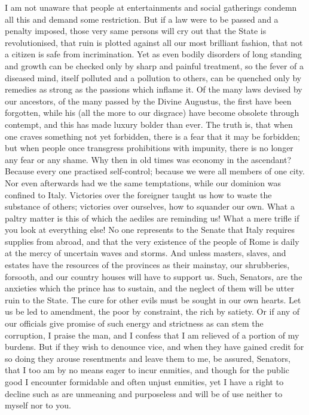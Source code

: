
I am not unaware that people at entertainments and social gatherings condemn all this and demand some restriction. But if a law were to be passed and a penalty imposed, those very same persons will cry out that the State is revolutionised, that ruin is plotted against all our most brilliant fashion, that not a citizen is safe from incrimination. Yet as even bodily disorders of long standing and growth can be checked only by sharp and painful treatment, so the fever of a diseased mind, itself polluted and a pollution to others, can be quenched only by remedies as strong as the passions which inflame it. Of the many laws devised by our ancestors, of the many passed by the Divine Augustus, the first have been forgotten, while his (all the more to our disgrace) have become obsolete through contempt, and this has made luxury bolder than ever. The truth is, that when one craves something not yet forbidden, there is a fear that it may be forbidden; but when people once transgress prohibitions with impunity, there is no longer any fear or any shame. Why then in old times was economy in the ascendant? Because every one practised self-control; because we were all members of one city. Nor even afterwards had we the same temptations, while our dominion was confined to Italy. Victories over the foreigner taught us how to waste the substance of others; victories over ourselves, how to squander our own. What a paltry matter is this of which the aediles are reminding us! What a mere trifle if you look at everything else! No one represents to the Senate that Italy requires supplies from abroad, and that the very existence of the people of Rome is daily at the mercy of uncertain waves and storms. And unless masters, slaves, and estates have the resources of the provinces as their mainstay, our shrubberies, forsooth, and our country houses will have to support us. Such, Senators, are the anxieties which the prince has to sustain, and the neglect of them will be utter ruin to the State. The cure for other evils must be sought in our own hearts. Let us be led to amendment, the poor by constraint, the rich by satiety. Or if any of our officials give promise of such energy and strictness as can stem the corruption, I praise the man, and I confess that I am relieved of a portion of my burdens. But if they wish to denounce vice, and when they have gained credit for so doing they arouse resentments and leave them to me, be assured, Senators, that I too am by no means eager to incur enmities, and though for the public good I encounter formidable and often unjust enmities, yet I have a right to decline such as are unmeaning and purposeless and will be of use neither to myself nor to you.

